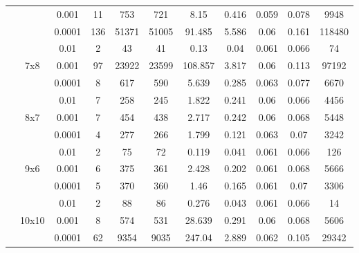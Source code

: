 {\begin{tabular}{|*{11}{c|}}
\cline{3-11}
 &  & 0.001  & 11 & 753 & 721 & 8.15 & 0.416 & 0.059 & 0.078 & 9948 \\
\cline{3-11}
 &  & 0.0001  & 136 & 51371 & 51005 & 91.485 & 5.586 & 0.06 & 0.161 & 118480 \\
\cline{3-11}
\cline{2-11}
 & \multirow{3}{*}{7x8}  & 0.01  & 2 & 43 & 41 & 0.13 & 0.04 & 0.061 & 0.066 & 74 \\
\cline{3-11}
 &  & 0.001  & 97 & 23922 & 23599 & 108.857 & 3.817 & 0.06 & 0.113 & 97192 \\
\cline{3-11}
 &  & 0.0001  & 8 & 617 & 590 & 5.639 & 0.285 & 0.063 & 0.077 & 6670 \\
\cline{3-11}
\cline{2-11}
 & \multirow{3}{*}{8x7}  & 0.01  & 7 & 258 & 245 & 1.822 & 0.241 & 0.06 & 0.066 & 4456 \\
\cline{3-11}
 &  & 0.001  & 7 & 454 & 438 & 2.717 & 0.242 & 0.06 & 0.068 & 5448 \\
\cline{3-11}
 &  & 0.0001  & 4 & 277 & 266 & 1.799 & 0.121 & 0.063 & 0.07 & 3242 \\
\cline{3-11}
\cline{2-11}
 & \multirow{3}{*}{9x6}  & 0.01  & 2 & 75 & 72 & 0.119 & 0.041 & 0.061 & 0.066 & 126 \\
\cline{3-11}
 &  & 0.001  & 6 & 375 & 361 & 2.428 & 0.202 & 0.061 & 0.068 & 5666 \\
\cline{3-11}
 &  & 0.0001  & 5 & 370 & 360 & 1.46 & 0.165 & 0.061 & 0.07 & 3306 \\
\cline{3-11}
\cline{2-11}
 & \multirow{3}{*}{10x10}  & 0.01  & 2 & 88 & 86 & 0.276 & 0.043 & 0.061 & 0.066 & 14 \\
\cline{3-11}
 &  & 0.001  & 8 & 574 & 531 & 28.639 & 0.291 & 0.06 & 0.068 & 5606 \\
\cline{3-11}
 &  & 0.0001  & 62 & 9354 & 9035 & 247.04 & 2.889 & 0.062 & 0.105 & 29342 \\
\cline{3-11}
\cline{2-11}
\hline
\end{tabular}}
